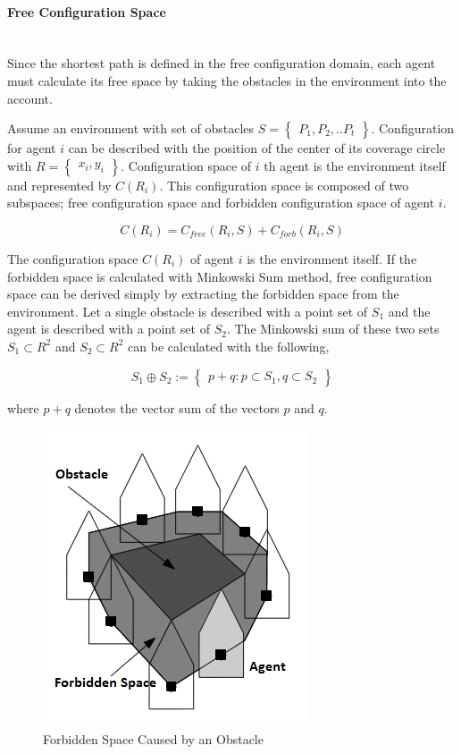 \paragraph{Free Configuration Space}\hspace{0pt} \\
Since the shortest path is defined in the free configuration domain, each agent must calculate its free space by taking the obstacles in the environment into the account. 

Assume an environment with set of obstacles $S = \begin{Bmatrix}
P_1, P_2, .. P_t \end{Bmatrix}$. Configuration for agent $i$ can be described with the position of the center of its coverage circle with $R=\begin{Bmatrix}x_i, y_i\end{Bmatrix}$. Configuration space of $i$ th agent is the environment itself and represented by $C(R_i)$. This configuration space is composed of two subspaces; free configuration space and forbidden configuration space of agent $i$.

\begin{equation}
C(R_i) = C_{free}(R_i,S) + C_{forb}(R_i,S)
\end{equation}

The configuration space $C(R_i)$ of agent $i$ is the environment itself. If the forbidden space is calculated with Minkowski Sum method, free configuration space can be derived simply by extracting the forbidden space from the environment. Let a single obstacle is described with a point set of $S_1$ and the agent is described with a point set of $S_2$. The Minkowski sum of these two sets $S_1 \subset R^2$ and $S_2 \subset R^2$ can be calculated with the following,
	
\begin{equation}
S_1 \oplus S_2 := \begin{Bmatrix}
p+q : p \subset S_1, q \subset S_2
\end{Bmatrix} 
\end{equation}

where $p+q$ denotes the vector sum of the vectors $p$ and $q$.
		
\begin{figure}[H]
\caption{Forbidden Space Caused by an Obstacle}
\centering
\includegraphics[scale = 0.4]{Forbidden}
\end{figure}
	
